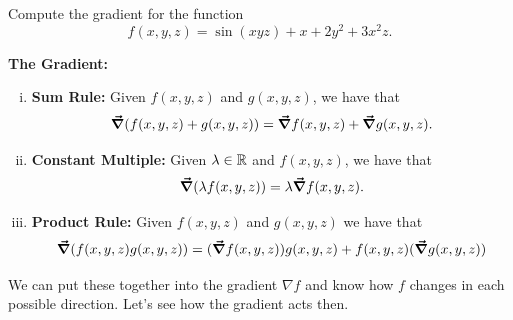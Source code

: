                         \begin{exercise}
                        Compute the gradient for the function
                        \[
                        f(x,y,z)=\sin(xyz)+x+2y^2+3x^2z.
                        \]
                        \end{exercise}

                        \noindent\textbf{The Gradient:}
                        \begin{enumerate}[(i)]
                            \item \textbf{Sum Rule:} Given $f(x,y,z)$ and $g(x,y,z)$, we have that
                            \[
                            \boldsymbol{\vec{\nabla}}(f(x,y,z)+g(x,y,z))=\boldsymbol{\vec{\nabla}} f(x,y,z)+\boldsymbol{\vec{\nabla}} g(x,y,z).
                            \]
                            \item \textbf{Constant Multiple:} Given $\lambda \in \mathbb{R}$ and $f(x,y,z)$, we have that
                            \[
                            \boldsymbol{\vec{\nabla}}(\lambda f(x,y,z))=\lambda \boldsymbol{\vec{\nabla}} f(x,y,z).
                            \]
                            \item \textbf{Product Rule:} Given $f(x,y,z)$ and $g(x,y,z)$ we have that
                            \[
                            \boldsymbol{\vec{\nabla}}(f(x,y,z)g(x,y,z))=(\boldsymbol{\vec{\nabla}} f(x,y,z))g(x,y,z)+f(x,y,z)(\boldsymbol{\vec{\nabla}} g(x,y,z))
                            \]

                        \end{enumerate}

                        We can put these together into the gradient $\nabla f$ and know how $f$ changes in each possible direction. Let's see how the gradient acts then.

